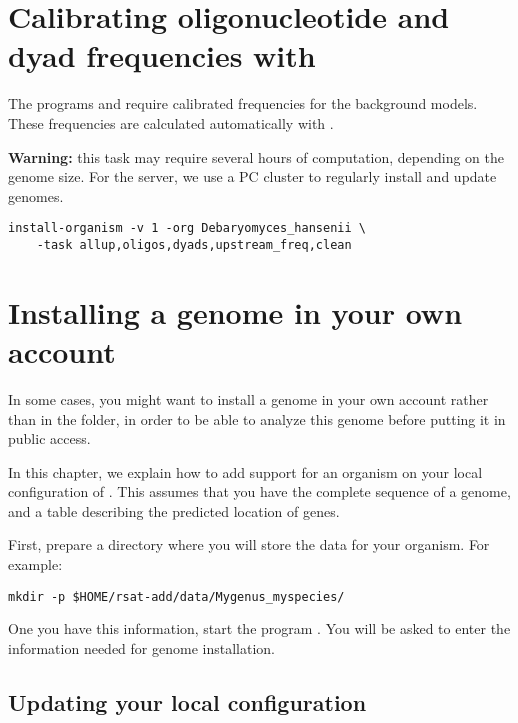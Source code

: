 \section{Calibrating oligonucleotide and dyad frequencies with }

The programs  and 
require calibrated frequencies for the background models. These
frequencies are calculated automatically with
.

\textbf{Warning: } this task may require several hours of computation,
depending on the genome size. For the \RSAT server, we use a PC
cluster to regularly install and update genomes.

\begin{footnotesize}
\begin{verbatim}
install-organism -v 1 -org Debaryomyces_hansenii \
    -task allup,oligos,dyads,upstream_freq,clean
\end{verbatim}
\end{footnotesize}

\section{Installing a genome in your own account}

In some cases, you might want to install a genome in your own account
rather than in the \RSAT folder, in order to be able to analyze this
genome before putting it in public access.


In this chapter, we explain how to add support for an organism on your
local configuration of \RSAT. This assumes that you have the complete
sequence of a genome, and a table describing the predicted location of
genes.

First, prepare a directory where you will store the data for your
organism. For example:

\begin{footnotesize}
\begin{verbatim}
mkdir -p $HOME/rsat-add/data/Mygenus_myspecies/
\end{verbatim}
\end{footnotesize}


One you have this information, start the program
. You will be asked to enter the information
needed for genome installation.

\subsection{Updating your local configuration}


